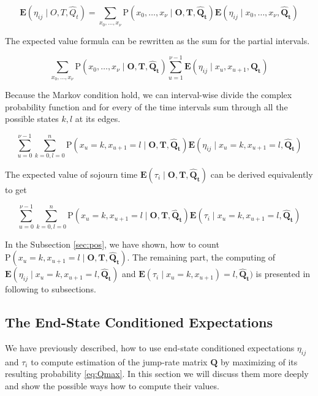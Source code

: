 \documentclass[thesis=M,english]{FITthesis}[2012/10/20]
\newcommand{\matr}[1]{\mathbf{#1}}
\begin{document}
\begin{equation} 
\mathbf{E}(\eta_{ij} \mid O,T, \hat Q_t ) = \sum_{x_0,\dots,x_\nu} \mathrm{P}(x_0,\dots,x_\nu \mid \matr{O},\matr{T}, \matr{ \hat Q_t }) \mathbf{E}(\eta_{ij} \mid x_0,\dots,x_\nu , \matr{\hat Q_t} )
\end{equation}

The expected value formula can be rewritten as the sum for the partial intervals.  

\begin{equation}
 \sum_{x_0,\dots,x_\nu} \mathrm{P}(x_0,\dots,x_\nu \mid \matr{O},\matr{T}, \matr{ \hat Q_t }) \sum_{u=1}^{\nu-1}\mathbf{E}(\eta_{ij} \mid x_u, x_{u+1} ,\matr{\hat Q_t} )
\end{equation}

Because the Markov condition hold, we can interval-wise divide the complex probability function and for every of the time intervals sum through all the possible states $k,l$ at its edges. 

\begin{equation}
\sum_{u=0}^{\nu-1} \sum_{k=0,l=0}^n \mathrm{P}( x_u = k, x_{u+1} = l \mid \matr{O},\matr{T}, \matr{ \hat Q_t }) \mathbf{E}(\eta_{ij} \mid x_u = k, x_{u+1} = l, \matr{ \hat Q_t } )
\end{equation}

The expected value of sojourn time $\mathbf{E}( \tau_i \mid \matr{O},\matr{T}, \matr{ \hat Q_t } )$ can be derived equivalently to get

\begin{equation}\label{eq:tau}
\sum_{u=0}^{\nu-1} \sum_{k=0,l=0}^n \mathrm{P}( x_u = k, x_{u+1} = l \mid \matr{O},\matr{T}, \matr{ \hat Q_t }) \mathbf{E}(\tau_i \mid x_u = k, x_{u+1} = l,\matr{\hat Q_t} )
\end{equation}

In the Subsection \ref{sec:pos}, we have shown, how to count $\mathrm{P}(x_u = k,x_{u+1} = l \mid \matr{O},\matr{T}, \matr{ \hat Q_t })$. The remaining part, the computing of $\mathbf{E}(\eta_{ij} \mid x_u = k, x_{u+1} = l,\matr{\hat Q_t} )$ and $\mathbf{E}(\tau_i \mid x_u = k, x_{u+1}) = l, \matr{ \hat Q_t } )$ is presented in following to subsections. 

\subsection{The End-State Conditioned Expectations}\label{sec:endexp}

We have previously described, how to use end-state conditioned expectations $\eta_{ij}$ and $\tau_i$ to compute estimation of the jump-rate matrix $\matr{Q}$ by maximizing of its resulting probability \eqref{eq:Qmax}. In this section we will discuss them more deeply and show the possible ways how to compute their values.
\end{document}
